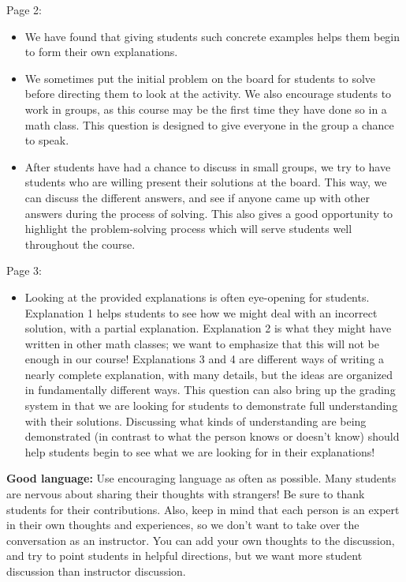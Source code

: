 \documentclass[noauthor,nooutcomes, handout]{ximera}
\begin{document}
\begin{instructorNotes}
Page 2:
\begin{itemize}
\item   We have found that giving students such concrete examples helps them begin to form their own explanations.


\item We sometimes put the initial problem on the board for students to solve before directing them to look at the activity.  We also encourage students to work in groups, as this course may be the first time they have done so in a math class.  This question is designed to give everyone in the group a chance to speak.

\item After students have had a chance to discuss in small groups, we try to have students who are willing present their solutions at the board.  This way, we can discuss the different answers, and see if anyone came up with other answers during the process of solving.  This also gives a good opportunity to highlight the problem-solving process which will serve students well throughout the course.
\end{itemize}

Page 3:
\begin{itemize}
\item 
Looking at the provided explanations is often eye-opening for students.  Explanation 1 helps students to see how we might deal with an incorrect solution, with a partial explanation.  Explanation 2 is what they might have written in other math classes; we want to emphasize that this will not be enough in our course!  Explanations 3 and 4 are different ways of writing a nearly complete explanation, with many details, but the ideas are organized in fundamentally different ways.  This question can also bring up the grading system in that we are looking for students to demonstrate full understanding with their solutions. Discussing what kinds of understanding are being demonstrated (in contrast to what the person knows or doesn't know) should help students begin to see what we are looking for in their explanations!
\end{itemize}


{\bf Good language:}                                                                                                                                                   
Use encouraging language as often as possible. Many students are nervous about sharing their thoughts with strangers! Be sure to thank students for their contributions. Also, keep in mind that each person is an expert in their own thoughts and experiences, so we don't want to take over the conversation as an instructor. You can add your own thoughts to the discussion, and try to point students in helpful directions, but we want more student discussion than instructor discussion.







\end{instructorNotes}
\end{document}
